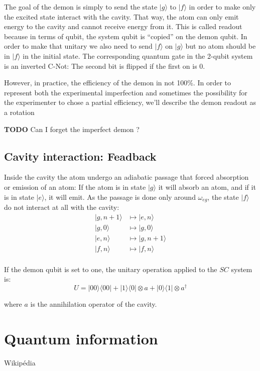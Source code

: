 \documentclass[10pt]{report}
\theoremstyle{plain}
\theoremstyle{definition}
\theoremstyle{remark}
\newcommand{\TODO}{\textbf{TODO}}
\newcommand{\ket}[1]{|#1\rangle}
\newcommand{\bra}[1]{\langle#1|}
\begin{document}
The goal of the demon is simply to send the state $\ket g$ to $\ket f$ in order
to make only the excited state interact with the cavity. That way, the atom can
only emit energy to the cavity and cannot receive energy from it. This is called
readout because in terms of qubit, the system qubit is ``copied'' on the demon
qubit. In order to make that unitary we also need to send $\ket f$ on $\ket g$
but no atom should be in $\ket f$ in the initial state. The corresponding quantum
gate in the 2-qubit system is an inverted C-Not: The second bit is flipped if
the first on is 0.

However, in practice, the efficiency of the demon in not 100\%. In order to
represent both the experimental imperfection and sometimes the possibility for
the experimenter to chose a partial efficiency, we'll describe the demon readout
as a rotation

\TODO{} Can I forget the imperfect demon ?

\subsection{Cavity interaction: Feadback}

Inside the cavity the atom undergo an adiabatic passage that forced absorption
or emission of an atom: If the atom is in state $\ket g$ it will absorb an atom,
and if it is in state $\ket e$, it will emit. As the passage is done only around
$\omega_{eg}$, the state $\ket f$ do not interact at all with the cavity:
\begin{align*}
  \ket{g,n+1} &\mapsto \ket{e,n}\\
  \ket{g,0} &\mapsto \ket{g,0}\\
  \ket{e,n} &\mapsto \ket{g,n+1}\\
  \ket{f,n} &\mapsto \ket{f,n}\\
\end{align*}

If the demon qubit is set to one, the unitary operation applied to the $SC$
system is:
\[U = \ket{00}\bra{00} + \ket 1 \bra 0 \otimes a + \ket 0 \bra 1 \otimes a^\dagger\]

where $a$ is the annihilation operator of the cavity.



\section{Quantum information}

Wikipédia
\end{document}
